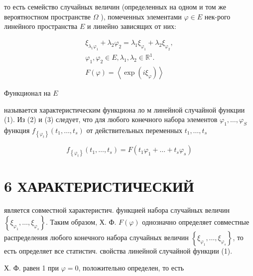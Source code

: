\documentclass[10pt]{article}
\begin{document}
то есть семейство случайных величин (определенных на одном и том же вероятностном пространстве $\Omega$ ), помеченных элементами $\varphi \in E$ нек-рого линейного пространства $E$ и линейно зависящих от них:



\[

\begin{gathered}

\xi_{\lambda_{1} \varphi_{1}}+\lambda_{2} \varphi_{2}=\lambda_{1} \xi_{\varphi_{1}}+\lambda_{2} \xi_{\varphi_{2}}, \\

\varphi_{1}, \varphi_{2} \in E, \lambda_{1}, \lambda_{2} \in \mathbb{R}^{1} . \\

F(\varphi)=\left\langle\exp \left(i \xi_{\varphi}\right)\right\rangle

\end{gathered}

\]



Функционал на $E$



называется характеристическим функциона ло м линейной случайной функции (1). Из (2) и (3) следует, что для любого конечного набора элементов $\varphi_{1}, \ldots, \varphi_{S}$ функция $f_{\left\{\varphi_{t}\right\}}\left(t_{1}, \ldots, t_{s}\right)$ от действительных переменных $t_{1}, \ldots, t_{s}$



\[

f_{\left\{\varphi_{t}\right\}}\left(t_{1}, \ldots, t_{s}\right)=F\left(t_{1} \varphi_{1}+\ldots+t_{s} \varphi_{s}\right)

\]



\section{6 ХАРАКТЕРИСТИЧЕСКИЙ}

является совместной характеристич. функцией набора случайных величин $\left\{\xi_{\varphi_{1}}, \ldots, \xi_{\varphi_{s}}\right\}$. Таким образом, Х. Ф. $F(\varphi)$ однозначно определяет совместные распределения любого конечного набора случайных величин $\left\{\xi_{\varphi_{1}}, \ldots, \xi_{\varphi_{s}}\right\}$, то есть определяет все статистич. свойства линейной случайной функции (1).



Х. Ф. равен 1 при $\varphi=0$, положительно определен, то есть
\end{document}
